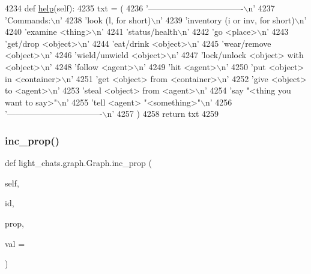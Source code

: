 \begin{DoxyCode}
4234     \textcolor{keyword}{def }\hyperlink{namespaceparlai_1_1agents_1_1tfidf__retriever_1_1build__tfidf_a078522f7d10d021f5e4855b140fc9666}{help}(self):
4235         txt = (
4236             \textcolor{stringliteral}{'----------------------------------\(\backslash\)n'}
4237             \textcolor{stringliteral}{'Commands:\(\backslash\)n'}
4238             \textcolor{stringliteral}{'look (l, for short)\(\backslash\)n'}
4239             \textcolor{stringliteral}{'inventory (i or inv, for short)\(\backslash\)n'}
4240             \textcolor{stringliteral}{'examine <thing>\(\backslash\)n'}
4241             \textcolor{stringliteral}{'status/health\(\backslash\)n'}
4242             \textcolor{stringliteral}{'go <place>\(\backslash\)n'}
4243             \textcolor{stringliteral}{'get/drop <object>\(\backslash\)n'}
4244             \textcolor{stringliteral}{'eat/drink <object>\(\backslash\)n'}
4245             \textcolor{stringliteral}{'wear/remove <object>\(\backslash\)n'}
4246             \textcolor{stringliteral}{'wield/unwield <object>\(\backslash\)n'}
4247             \textcolor{stringliteral}{'lock/unlock <object> with <object>\(\backslash\)n'}
4248             \textcolor{stringliteral}{'follow <agent>\(\backslash\)n'}
4249             \textcolor{stringliteral}{'hit <agent>\(\backslash\)n'}
4250             \textcolor{stringliteral}{'put <object> in <container>\(\backslash\)n'}
4251             \textcolor{stringliteral}{'get <object> from <container>\(\backslash\)n'}
4252             \textcolor{stringliteral}{'give <object> to <agent>\(\backslash\)n'}
4253             \textcolor{stringliteral}{'steal <object> from <agent>\(\backslash\)n'}
4254             \textcolor{stringliteral}{'say "<thing you want to say>"\(\backslash\)n'}
4255             \textcolor{stringliteral}{'tell <agent> "<something>"\(\backslash\)n'}
4256             \textcolor{stringliteral}{'----------------------------------\(\backslash\)n'}
4257         )
4258         \textcolor{keywordflow}{return} txt
4259 
\end{DoxyCode}
\mbox{\label{classlight__chats_1_1graph_1_1Graph_a871d833484089923fa5d1d4bb357ec7a}} 
\subsubsection{\texorpdfstring{inc\+\_\+prop()}{inc\_prop()}}
{\footnotesize\ttfamily def light\+\_\+chats.\+graph.\+Graph.\+inc\+\_\+prop (\begin{DoxyParamCaption}\item[{}]{self,  }\item[{}]{id,  }\item[{}]{prop,  }\item[{}]{val = {} }\end{DoxyParamCaption})}

